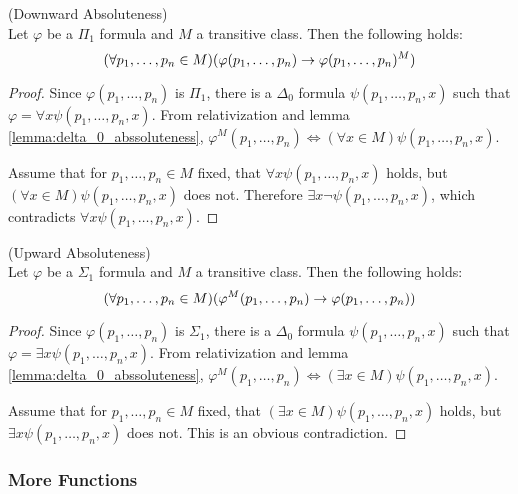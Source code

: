 \begin{lemma}{(Downward Absoluteness)}\label{lemma:downward_absoluteness}\\
Let $\varphi$ be a $\Pi_1$ formula and $M$ a transitive class. Then the following holds:
\begin{equation}
(\forall p_1, \ldots, p_n \in M)(\varphi(p_1, \ldots, p_n) \rightarrow \varphi(p_1, \ldots, p_n)^M)
\end{equation}
\end{lemma}
\begin{proof}
Since $\varphi(p_1, \ldots, p_n)$ is $\Pi_1$, there is a $\Delta_0$ formula $\psi(p_1, \ldots, p_n, x)$ such that $\varphi = \forall x \psi(p_1, \ldots, p_n, x)$. From relativization and lemma \ref{lemma:delta_0_abssoluteness}, $\varphi^M(p_1, \ldots, p_n) \iff (\forall x \in M)\psi(p_1, \ldots, p_n, x)$.

Assume that for $p_1, \ldots, p_n \in M$ fixed, that $\forall x \psi(p_1, \ldots, p_n, x)$ holds, but $(\forall x \in M)\psi(p_1, \ldots, p_n, x)$ does not. 
Therefore $\exists x \neg \psi(p_1, \ldots, p_n, x)$, which contradicts $\forall x \psi(p_1, \ldots, p_n, x)$.
\end{proof}


\begin{lemma}{(Upward Absoluteness)}\label{lemma:upward_absoluteness}\\
Let $\varphi$ be a $\Sigma_1$ formula and $M$ a transitive class. Then the following holds:
\begin{equation}
(\forall p_1, \ldots, p_n \in M)(\varphi^M(p_1, \ldots, p_n) \rightarrow \varphi(p_1, \ldots, p_n))
\end{equation}
\end{lemma}
\begin{proof}
Since $\varphi(p_1, \ldots, p_n)$ is $\Sigma_1$, there is a $\Delta_0$ formula $\psi(p_1, \ldots, p_n, x)$ such that $\varphi = \exists x \psi(p_1, \ldots, p_n, x)$. From relativization and lemma \ref{lemma:delta_0_abssoluteness}, $\varphi^M(p_1, \ldots, p_n) \iff (\exists x \in M)\psi(p_1, \ldots, p_n, x)$.

Assume that for $p_1, \ldots, p_n \in M$ fixed, that $(\exists x \in M)\psi(p_1, \ldots, p_n, x)$ holds, but $\exists x \psi(p_1, \ldots, p_n, x)$ does not. This is an obvious contradiction.
\end{proof}


\subsubsection{More Functions}


